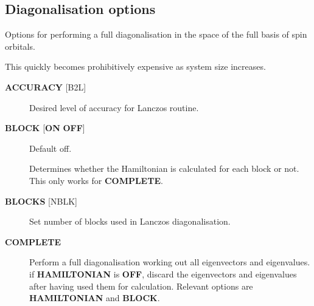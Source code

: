 \documentclass[openany,a4paper,10pt]{manual}
\begin{document}
\subsection{Diagonalisation options}

Options for performing a full diagonalisation in the space of the full
basis of spin orbitals.

\begin{notice}[warning]
This quickly becomes prohibitively expensive as system size increases.
\end{notice}
\begin{description}
\item[\textbf{ACCURACY} {[}B2L{]}]
Desired level of accuracy for Lanczos routine.

\item[\textbf{BLOCK} {[}\textbf{ON} \textbf{OFF}{]}]
Default off.

Determines whether the Hamiltonian is calculated for each block
or not.  This only works for \textbf{COMPLETE}.

\item[\textbf{BLOCKS} {[}NBLK{]}]
Set number of blocks used in Lanczos diagonalisation.

\item[\textbf{COMPLETE}]
Perform a full diagonalisation working out all eigenvectors
and eigenvalues.  if \textbf{HAMILTONIAN} is \textbf{OFF}, discard the
eigenvectors and eigenvalues after having used them for calculation.
Relevant options are \textbf{HAMILTONIAN} and \textbf{BLOCK}.

\end{description}
\end{document}
